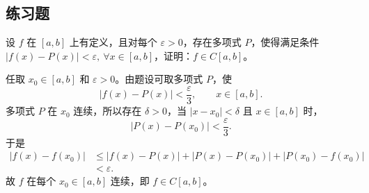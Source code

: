 \subsection{练习题}

\begin{xexercise}[1]
设 $f$ 在 $[a,b]$ 上有定义，且对每个 $\varepsilon>0$，存在多项式 $P$，使得满足条件 $|f(x)-P(x)|<\varepsilon,\ \forall x\in[a,b]$，证明：$f\in C[a,b]$。
\end{xexercise}
\begin{xsolution}
任取 $x_0\in[a,b]$ 和 $\varepsilon>0$。由题设可取多项式 $P$，使
\[
  |f(x)-P(x)|<\frac\varepsilon3,
  \qquad x\in[a,b].
\]
多项式 $P$ 在 $x_0$ 连续，所以存在 $\delta>0$，当 $|x-x_0|<\delta$ 且 $x\in[a,b]$ 时，
\[
  |P(x)-P(x_0)|<\frac\varepsilon3.
\]
于是
\[
\begin{aligned}
  |f(x)-f(x_0)|
  &\leqslant|f(x)-P(x)|+|P(x)-P(x_0)|+|P(x_0)-f(x_0)|\\
  &<\varepsilon.
\end{aligned}
\]
故 $f$ 在每个 $x_0\in[a,b]$ 连续，即 $f\in C[a,b]$。
\end{xsolution}


